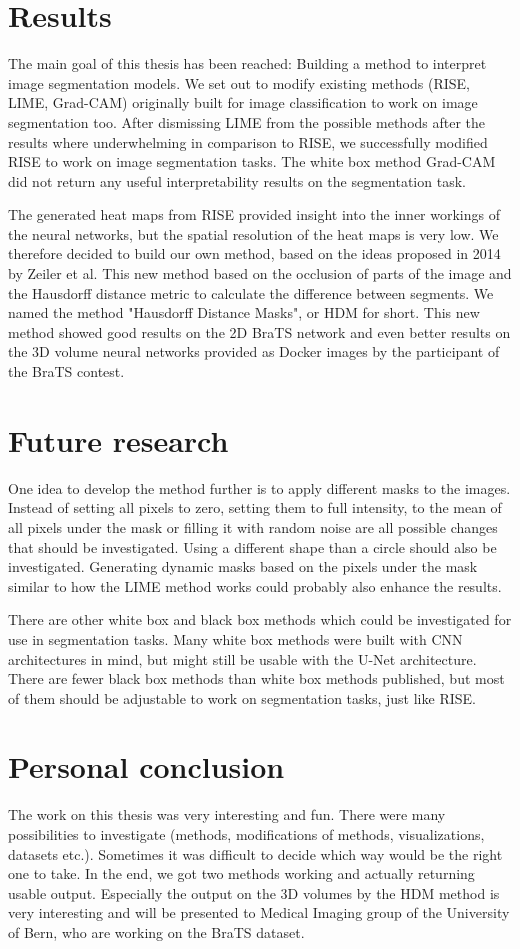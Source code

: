 \section{Results}
The main goal of this thesis has been reached: Building a method to interpret image segmentation models. We set out to modify existing methods (RISE, LIME, Grad-CAM) originally built for image classification to work on image segmentation too. After dismissing LIME from the possible methods after the results where underwhelming in comparison to RISE, we successfully modified RISE to work on image segmentation tasks. The white box method Grad-CAM did not return any useful interpretability results on the segmentation task.

The generated heat maps from RISE provided insight into the inner workings of the neural networks, but the spatial resolution of the heat maps is very low. We therefore decided to build our own method, based on the ideas proposed in 2014 by Zeiler et al. This new method based on the occlusion of parts of the image and the Hausdorff distance metric to calculate the difference between segments. We named the method "Hausdorff Distance Masks", or HDM for short. This new method showed good results on the 2D BraTS network and even better results on the 3D volume neural networks provided as Docker images by the participant of the BraTS contest.

\section{Future research}
One idea to develop the method further is to apply different masks to the images. Instead of setting all pixels to zero, setting them to full intensity, to the mean of all pixels under the mask or filling it with random noise are all possible changes that should be investigated. Using a different shape than a circle should also be investigated. Generating dynamic masks based on the pixels under the mask similar to how the LIME method works could probably also enhance the results.

There are other white box and black box methods which could be investigated for use in segmentation tasks. Many white box methods were built with CNN architectures in mind, but might still be usable with the U-Net architecture. There are fewer black box methods than white box methods published, but most of them should be adjustable to work on segmentation tasks, just like RISE.

\section{Personal conclusion}
The work on this thesis was very interesting and fun. There were many possibilities to investigate (methods, modifications of methods, visualizations, datasets etc.). Sometimes it was difficult to decide which way would be the right one to take. In the end, we got two methods working and actually returning usable output. Especially the output on the 3D volumes by the HDM method is very interesting and will be presented to Medical Imaging group of the University of Bern, who are working on the BraTS dataset.
